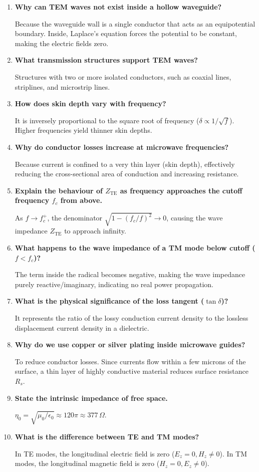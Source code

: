 \documentclass[12pt,a4paper]{article}
\newcommand{\Q}[1]{\textbf{#1}\par\noindent\ignorespaces}
\begin{document}
\begin{tcolorbox}[exambox, title={\textbf{Frequently Asked / Viva Questions}}]
\begin{enumerate}[topsep=0pt, label=\textbf{Q\arabic*.}, itemsep=5pt]
  \item \Q{Why can TEM waves not exist inside a hollow waveguide?}
    Because the waveguide wall is a single conductor that acts as an equipotential boundary. Inside, Laplace's equation forces the potential to be constant, making the electric fields zero.
  \item \Q{What transmission structures support TEM waves?}
    Structures with two or more isolated conductors, such as coaxial lines, striplines, and microstrip lines.
  \item \Q{How does skin depth vary with frequency?}
    It is inversely proportional to the square root of frequency ($\delta \propto 1/\sqrt{f}$). Higher frequencies yield thinner skin depths.
  \item \Q{Why do conductor losses increase at microwave frequencies?}
    Because current is confined to a very thin layer (skin depth), effectively reducing the cross-sectional area of conduction and increasing resistance.
  \item \Q{Explain the behaviour of $Z_{\text{TE}}$ as frequency approaches the cutoff frequency $f_c$ from above.}
    As $f \to f_c^+$, the denominator $\sqrt{1-(f_c/f)^2} \to 0$, causing the wave impedance $Z_{\text{TE}}$ to approach infinity.
  \item \Q{What happens to the wave impedance of a TM mode below cutoff ($f < f_c$)?}
    The term inside the radical becomes negative, making the wave impedance purely reactive/imaginary, indicating no real power propagation.
  \item \Q{What is the physical significance of the loss tangent ($\tan \delta$)?}
    It represents the ratio of the lossy conduction current density to the lossless displacement current density in a dielectric.
  \item \Q{Why do we use copper or silver plating inside microwave guides?}
    To reduce conductor losses. Since currents flow within a few microns of the surface, a thin layer of highly conductive material reduces surface resistance $R_s$.
  \item \Q{State the intrinsic impedance of free space.}
    $\eta_0 = \sqrt{\mu_0/\epsilon_0} \approx 120\pi \approx 377\,\Omega$.
  \item \Q{What is the difference between TE and TM modes?}
    In TE modes, the longitudinal electric field is zero ($E_z = 0, H_z \ne 0$). In TM modes, the longitudinal magnetic field is zero ($H_z = 0, E_z \ne 0$).

\end{enumerate}
\end{tcolorbox}
\end{document}

